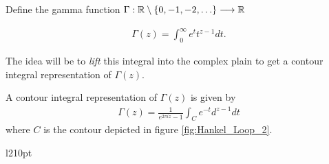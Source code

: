 \begin{mdframed}[innertopmargin=10pt]
\begin{definition}
Define the gamma function $ \Gamma : \mathbb{R} \setminus \{ 0, -1, -2, \ldots \} \longrightarrow \mathbb{R}  $

\begin{align}
    \Gamma(z) = \int_0^\infty e^t t^{z-1} dt.
\end{align}
\end{definition}
\end{mdframed}


The idea will be to \emph{lift} this integral into the complex plain to get a contour integral representation of $ \Gamma(z) $.

\begin{mdframed}[innertopmargin=10pt]
\begin{lemma}
    \label{lem:contour_gamma}
    A contour integral representation of $ \Gamma(z) $ is given by
    \begin{align}
        \Gamma(z) = \frac{1}{e^{2 \pi i z} - 1} \int_{C} e^{-t}d^{z-1} dt
    \end{align}
where $ C $ is the contour depicted in figure \ref{fig:Hankel_Loop_2}.
\end{lemma}
\end{mdframed}

\begin{wrapfigure}{l}{210pt}
    
    \caption{The Hankel contour C}
    \label{fig:Hankel_Loop_2}
\end{wrapfigure}


